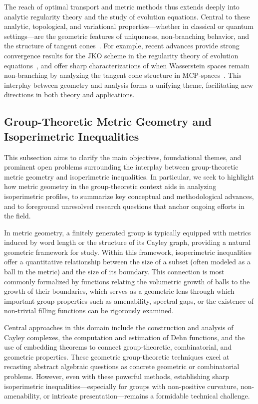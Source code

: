 \documentclass[sigconf]{acmart}
\begin{document}
\vspace{1em}
\noindent
The reach of optimal transport and metric methods thus extends deeply into analytic regularity theory and the study of evolution equations. Central to these analytic, topological, and variational properties—whether in classical or quantum settings—are the geometric features of uniqueness, non-branching behavior, and the structure of tangent cones~\cite{ref96,ref97,ref107}. For example, recent advances provide strong convergence results for the JKO scheme in the regularity theory of evolution equations~\cite{ref96}, and offer sharp characterizations of when Wasserstein spaces remain non-branching by analyzing the tangent cone structure in MCP-spaces~\cite{ref107}. This interplay between geometry and analysis forms a unifying theme, facilitating new directions in both theory and applications.

\subsection{Group-Theoretic Metric Geometry and Isoperimetric Inequalities}

This subsection aims to clarify the main objectives, foundational themes, and prominent open problems surrounding the interplay between group-theoretic metric geometry and isoperimetric inequalities. In particular, we seek to highlight how metric geometry in the group-theoretic context aids in analyzing isoperimetric profiles, to summarize key conceptual and methodological advances, and to foreground unresolved research questions that anchor ongoing efforts in the field.

In metric geometry, a finitely generated group is typically equipped with metrics induced by word length or the structure of its Cayley graph, providing a natural geometric framework for study. Within this framework, isoperimetric inequalities offer a quantitative relationship between the size of a subset (often modeled as a ball in the metric) and the size of its boundary. This connection is most commonly formalized by functions relating the volumetric growth of balls to the growth of their boundaries, which serves as a geometric lens through which important group properties such as amenability, spectral gaps, or the existence of non-trivial filling functions can be rigorously examined.

Central approaches in this domain include the construction and analysis of Cayley complexes, the computation and estimation of Dehn functions, and the use of embedding theorems to connect group-theoretic, combinatorial, and geometric properties. These geometric group-theoretic techniques excel at recasting abstract algebraic questions as concrete geometric or combinatorial problems. However, even with these powerful methods, establishing sharp isoperimetric inequalities---especially for groups with non-positive curvature, non-amenability, or intricate presentation---remains a formidable technical challenge.
\end{document}
